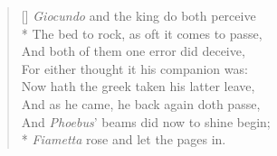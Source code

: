 \documentclass[MAIN]{subfiles}
\begin{document}
\begin{verse}[\versewidth]
\emph{Giocundo} and the king do both perceive\\*
\vin The bed to rock, as oft it comes to passe,\\
And both of them one error did deceive,\\
\vin For either thought it his companion was:\\
Now hath the greek taken his latter leave,\\
\vin And as he came, he back again doth passe,\\
And \emph{Phoebus}' beams did now to shine begin;\\*
\emph{Fiametta} rose and let the pages in.
\end{verse}
\end{document}
